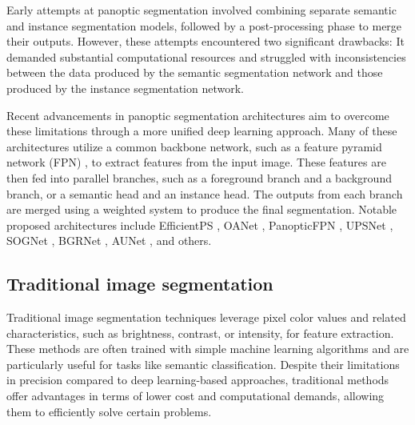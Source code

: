 Early attempts at panoptic segmentation involved combining separate semantic and instance segmentation models,
followed by a post-processing phase to merge their outputs. However, these attempts encountered two significant
drawbacks: It
demanded substantial computational resources and struggled with inconsistencies between the data produced by the
semantic segmentation network and those produced by the instance segmentation network.

Recent advancements in panoptic segmentation architectures aim to overcome these limitations through a more unified deep learning approach. Many of these architectures utilize a common backbone network, such as a feature pyramid network (FPN) \cite{FPNLin2017}, to extract features from the input image. These features are then fed into parallel branches, such as a foreground branch and a background branch, or a semantic head and an instance head. The outputs from each branch are merged using a weighted system to produce the final segmentation. Notable proposed architectures include EfficientPS \cite{mohan2020efficientps}, OANet \cite{zhang2019oanet}, PanopticFPN \cite{kirillov2019panoptic}, UPSNet \cite{xiong2019upsnet}, SOGNet \cite{yang2019sognet}, BGRNet \cite{wu2020bidirectional}, AUNet \cite{sun2019aunet}, and others.

\subsection{Traditional image segmentation}
Traditional image segmentation techniques leverage pixel color values and related characteristics, such as brightness, contrast, or intensity, for feature extraction. These methods are often trained with simple machine learning algorithms and are particularly useful for tasks like semantic classification. Despite their limitations in precision compared to deep learning-based approaches, traditional methods offer advantages in terms of lower cost and computational demands, allowing them to efficiently solve certain problems.

